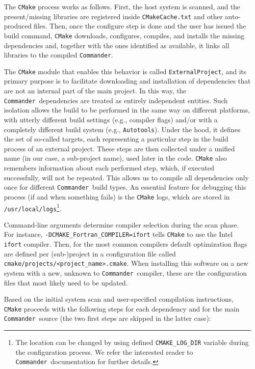 \documentclass[twocolumn]{aa}
\def\commander{\texttt{Commander}}
\begin{document}
The \texttt{CMake} process works as follows. First, the host system is scanned, and the present/missing  libraries are registered inside \texttt{CMakeCache.txt} and other auto-produced files. Then, once the configure step is done and the user has issued the build command, \texttt{CMake} downloads, configures, compiles, and installs the missing dependencies and, together with the ones identified as available, it links all libraries to the compiled \commander.

The \texttt{CMake} module that enables this behavior is called \texttt{ExternalProject}, and its primary purpose is to facilitate downloading and installation of dependencies that are not an internal part of the main project. In this way, the \commander\ dependencies are treated as entirely independent entities. Such isolation allows the build to be performed in the same way on different platforms, with utterly different build settings (e.g., compiler flags) and/or with a completely different build system (e.g., \texttt{Autotools}). Under the hood, it defines the set of so-called targets, each representing a particular step in the build process of an external project. These steps are then collected under a unified name (in our case, a sub-project name), used later in the code. \texttt{CMake} also remembers information about each performed step, which, if executed successfully, will not be repeated. This allows us to compile all dependencies only once for different \commander\ build types. An essential feature for debugging this process (if and when something fails) is the \texttt{CMake} logs, which are stored in \texttt{/usr/local/logs}\footnote{The location can be changed by using defined \texttt{CMAKE\_LOG\_DIR} variable during the configuration process. We refer the interested reader to \commander\ documentation for further details.}.

Command-line arguments determine compiler selection during the scan phase. For instance, \texttt{-DCMAKE\_Fortran\_COMPILER=ifort} tells \texttt{CMake} to use the Intel \texttt{ifort} compiler. Then, for the most common compilers default optimization flags are defined per (sub-)project in a configuration file called \texttt{cmake/projects/{<project\_name>}.cmake}. When installing this software on a new system with a new, unknown to \commander\, compiler, these are the configuration files that most likely need to be updated.

Based on the initial system scan and user-specified compilation instructions, \texttt{CMake} proceeds with the following steps for each dependency and for the main \commander\ source (the two first steps are skipped in the latter case):
\end{document}
